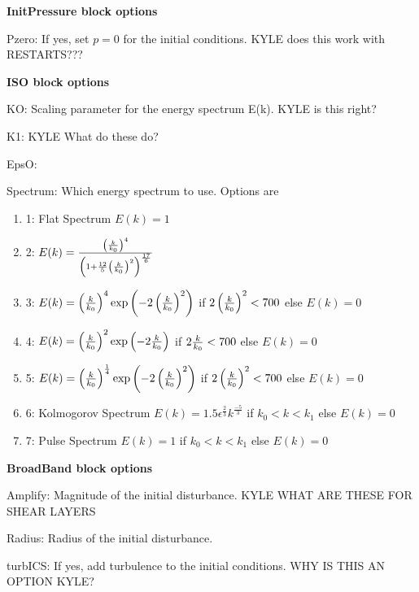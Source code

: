 \textbf{InitPressure block options}
\begin{description}
  \item Pzero: If yes, set $p=0$ for the initial conditions. KYLE does this work with RESTARTS???
\end{description}

\textbf{ISO block options}
\begin{description}
  \item KO: Scaling parameter for the energy spectrum E(k). KYLE is this right?
  \item K1: KYLE What do these do?
  \item EpsO: 
  \item Spectrum: Which energy spectrum to use. Options are
  \begin{enumerate}
    \item 1: Flat Spectrum $E(k)=1$
    \item 2: $E(k)=\frac{\left( \frac{k}{k_0} \right)^4}  
             {\left(1+\frac{12}{5}\left(\frac{k}{k_0} \right)^2 \right)^\frac{17}{6} }$
    \item 3: $E(k)=\left( \frac{k}{k_0} \right)^4 \exp\left( -2 \left( \frac{k}{k_0} \right) ^2 \right)$
             if $2 \left( \frac{k}{k_0} \right)^2 < 700 $ else $E(k)=0$
    \item 4: $E(k)=\left( \frac{k}{k_0} \right)^2 \exp\left( -2 \frac{k}{k_0} \right)$
             if $2  \frac{k}{k_0}  < 700 $ else $E(k)=0$
    \item 5: $E(k)=\left( \frac{k}{k_0} \right)^\frac{1}{4} \exp\left(-2 \left(\frac{k}{k_0} \right)^2\right)$
             if $2 \left( \frac{k}{k_0} \right)^2 < 700 $ else $E(k)=0$
    \item 6: Kolmogorov Spectrum $E(k)=1.5 \epsilon^ {\frac{2}{3}} k^{\frac{-5}{3}}$
             if $k_0 < k < k_1$ else $E(k)=0$
    \item 7: Pulse Spectrum $E(k)=1$ 
             if $k_0 < k < k_1$ else $E(k)=0$
  \end{enumerate}
\end{description}

\textbf{BroadBand block options}
\begin{description}
  \item Amplify: Magnitude of the initial disturbance. KYLE WHAT ARE THESE FOR SHEAR LAYERS
  \item Radius: Radius of the initial disturbance.
  \item turbICS: If yes, add turbulence to the initial conditions. WHY IS THIS AN OPTION KYLE?
\end{description}

